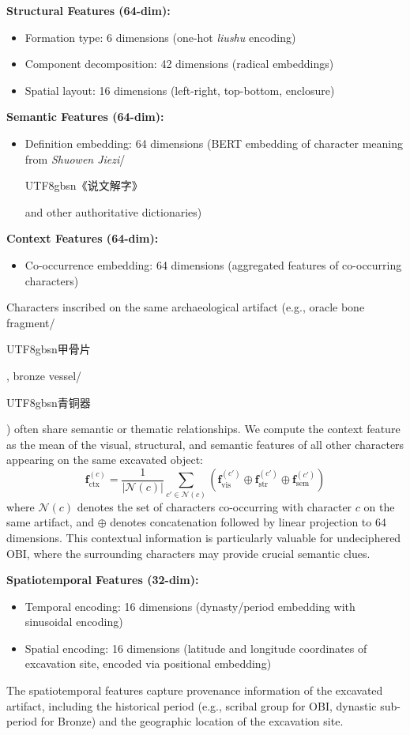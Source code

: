 \documentclass{article}
\newcommand{\cg}[1]{\begin{CJK*}{UTF8}{gbsn}#1\end{CJK*}}
\begin{document}
\textbf{Structural Features (64-dim):}
\begin{itemize}[leftmargin=*,itemsep=1pt]
\item Formation type: 6 dimensions (one-hot \textit{liushu} encoding)
\item Component decomposition: 42 dimensions (radical embeddings)
\item Spatial layout: 16 dimensions (left-right, top-bottom, enclosure)
\end{itemize}

\textbf{Semantic Features (64-dim):}
\begin{itemize}[leftmargin=*,itemsep=1pt]
\item Definition embedding: 64 dimensions (BERT embedding of character meaning from \textit{Shuowen Jiezi}/\cg{《说文解字》} and other authoritative dictionaries)
\end{itemize}

\textbf{Context Features (64-dim):}
\begin{itemize}[leftmargin=*,itemsep=1pt]
\item Co-occurrence embedding: 64 dimensions (aggregated features of co-occurring characters)
\end{itemize}
Characters inscribed on the same archaeological artifact (e.g., oracle bone fragment/\cg{甲骨片}, bronze vessel/\cg{青铜器}) often share semantic or thematic relationships. We compute the context feature as the mean of the visual, structural, and semantic features of all other characters appearing on the same excavated object:
\begin{equation}
\mathbf{f}_{\text{ctx}}^{(c)} = \frac{1}{|\mathcal{N}(c)|} \sum_{c' \in \mathcal{N}(c)} \left( \mathbf{f}_{\text{vis}}^{(c')} \oplus \mathbf{f}_{\text{str}}^{(c')} \oplus \mathbf{f}_{\text{sem}}^{(c')} \right)
\end{equation}
where $\mathcal{N}(c)$ denotes the set of characters co-occurring with character $c$ on the same artifact, and $\oplus$ denotes concatenation followed by linear projection to 64 dimensions. This contextual information is particularly valuable for undeciphered OBI, where the surrounding characters may provide crucial semantic clues.

\textbf{Spatiotemporal Features (32-dim):}
\begin{itemize}[leftmargin=*,itemsep=1pt]
\item Temporal encoding: 16 dimensions (dynasty/period embedding with sinusoidal encoding)
\item Spatial encoding: 16 dimensions (latitude and longitude coordinates of excavation site, encoded via positional embedding)
\end{itemize}
The spatiotemporal features capture provenance information of the excavated artifact, including the historical period (e.g., scribal group for OBI, dynastic sub-period for Bronze) and the geographic location of the excavation site.
\end{document}
